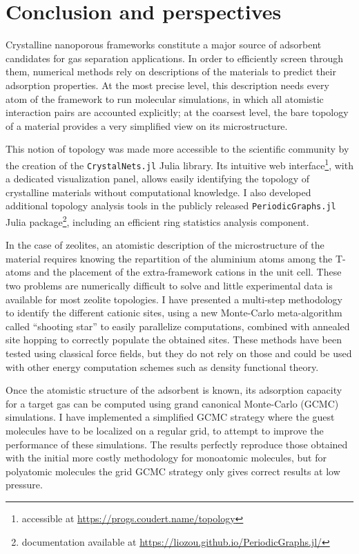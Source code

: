 
\chapter*{Conclusion and perspectives}

Crystalline nanoporous frameworks constitute a major source of adsorbent candidates for gas separation applications. In order to efficiently screen through them, numerical methods rely on descriptions of the materials to predict their adsorption properties. At the most precise level, this description needs every atom of the framework to run molecular simulations, in which all atomistic interaction pairs are accounted explicitly; at the coarsest level, the bare topology of a material provides a very simplified view on its microstructure.

This notion of topology was made more accessible to the scientific community by the creation of the \texttt{CrystalNets.jl} Julia library. Its intuitive web interface\footnote{accessible at \url{https://progs.coudert.name/topology}}, with a dedicated visualization panel, allows easily identifying the topology of crystalline materials without computational knowledge. I also developed additional topology analysis tools in the publicly released \texttt{PeriodicGraphs.jl} Julia package\footnote{documentation available at \url{https://liozou.github.io/PeriodicGraphs.jl/}}, including an efficient ring statistics analysis component.

In the case of zeolites, an atomistic description of the microstructure of the material requires knowing the repartition of the aluminium atoms among the T-atoms and the placement of the extra-framework cations in the unit cell. These two problems are numerically difficult to solve and little experimental data is available for most zeolite topologies. I have presented a multi-step methodology to identify the different cationic sites, using a new Monte-Carlo meta-algorithm called ``shooting star'' to easily parallelize computations, combined with annealed site hopping to correctly populate the obtained sites. These methods have been tested using classical force fields, but they do not rely on those and could be used with other energy computation schemes such as density functional theory.

Once the atomistic structure of the adsorbent is known, its adsorption capacity for a target gas can be computed using grand canonical Monte-Carlo (GCMC) simulations. I have implemented a simplified GCMC strategy where the guest molecules have to be localized on a regular grid, to attempt to improve the performance of these simulations. The results perfectly reproduce those obtained with the initial more costly methodology for monoatomic molecules, but for polyatomic molecules the grid GCMC strategy only gives correct results at low pressure.

